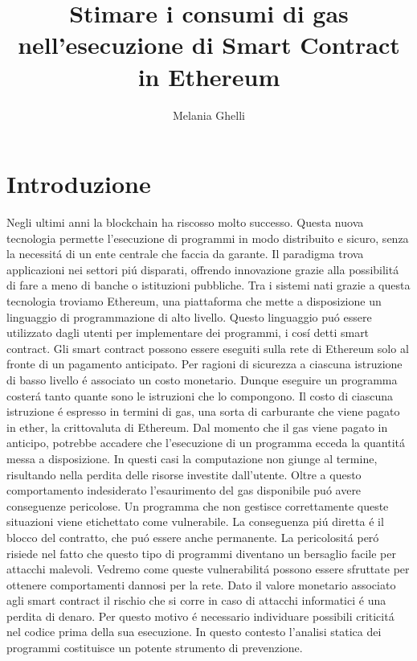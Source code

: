 \documentclass[a4paper,12pt]{report}
\title{Stimare i consumi di gas nell'esecuzione di Smart Contract in Ethereum}
\author{Melania Ghelli}
\begin{document}
\maketitle
\chapter*{Introduzione}


Negli ultimi anni la blockchain ha riscosso molto successo. Questa nuova tecnologia permette l'esecuzione di programmi in modo distribuito e sicuro, senza la necessit\'a di un ente centrale che faccia da garante. Il paradigma trova applicazioni nei settori pi\'u disparati, offrendo innovazione grazie alla possibilit\'a di fare a meno di banche o istituzioni pubbliche.\newline
Tra i sistemi nati grazie a questa tecnologia troviamo Ethereum, una piattaforma che mette a disposizione un linguaggio di programmazione di alto livello. Questo linguaggio pu\'o essere utilizzato dagli utenti per implementare dei programmi, i cos\'i detti smart contract.\newline
Gli smart contract possono essere eseguiti sulla rete di Ethereum solo al fronte di un pagamento anticipato. Per ragioni di sicurezza a ciascuna istruzione di basso livello \'e associato un costo monetario. Dunque eseguire un programma coster\'a tanto quante sono le istruzioni che lo compongono.\newline
Il costo di ciascuna istruzione \'e espresso in termini di gas, una sorta di carburante che viene pagato in ether, la crittovaluta di Ethereum.\newline
Dal momento che il gas viene pagato in anticipo, potrebbe accadere che l'esecuzione di un programma ecceda la quantit\'a messa a disposizione. In questi casi la computazione non giunge al termine, risultando nella perdita delle risorse investite dall'utente.
Oltre a questo comportamento indesiderato l'esaurimento del gas disponibile pu\'o avere conseguenze pericolose.\newline
Un programma che non gestisce correttamente queste situazioni viene etichettato come vulnerabile. La conseguenza pi\'u diretta \'e il blocco del contratto, che pu\'o essere anche permanente. La pericolosit\'a per\'o risiede nel fatto che questo tipo di programmi diventano un bersaglio facile per  attacchi malevoli. Vedremo come queste vulnerabilit\'a possono essere sfruttate per ottenere comportamenti dannosi per la rete.\newline
Dato il valore monetario associato agli smart contract il rischio che si corre in caso di attacchi informatici \'e una perdita di denaro. Per questo motivo \'e necessario individuare possibili criticit\'a nel codice prima della sua esecuzione. In questo contesto l'analisi statica dei programmi costituisce un potente strumento di prevenzione.\newline
\end{document}
